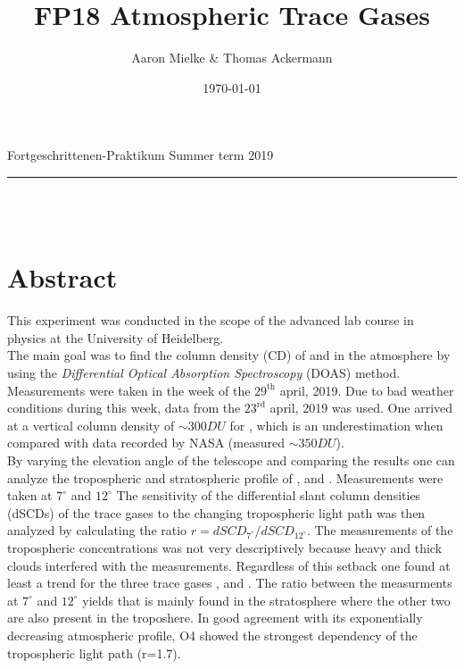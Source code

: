\documentclass[12pt, a4paper, bibliography=totoc]{scrartcl}
\title{FP18 Atmospheric Trace Gases}
\author{Aaron Mielke \& Thomas Ackermann}
\date{\today}
\begin{document}
\begin{center}
	\makeatletter
	\thispagestyle{empty}
	\large{Fortgeschrittenen-Praktikum}	
	\hfill
    \large{Summer term 2019}
    \vspace{5mm}
	\rule{\textwidth}{0.2pt}
    \vfill
	\Huge\textbf{\@title} \\
	\vspace{10mm}
	\large{\@author} \\
	\normalfont
	\vfill	
	\makeatother
\end{center}

\normalsize

\section*{Abstract}

This experiment was conducted in the scope of the advanced lab course in physics at the University of Heidelberg. \\
The main goal was to find the column density (CD) of  and  in the atmosphere by using the \textit{Differential Optical Absorption Spectroscopy} (DOAS) method. \\
Measurements were taken in the week of the $29^\text{th}$ april, 2019.
Due to bad weather conditions during this week, data from the $23^\text{rd}$ april, 2019 was used. 
One arrived at a vertical column density of $\sim 300 \si{DU}$ for , which is an underestimation when compared with data recorded by NASA (measured $\sim 350 \si{DU}$).\\ 
By varying the elevation angle of the telescope and comparing the results 
one can analyze the tropospheric and stratospheric profile of ,  and .
Measurements were taken at $7^\circ$ and $12^\circ$
The sensitivity of the differential slant column densities (dSCDs) of the trace gases to the changing tropospheric light path was then analyzed by calculating the ratio $r = dSCD_{7^\circ}/dSCD_{12^\circ}$. 
The measurements of the tropospheric concentrations was not very descriptively because heavy and thick clouds interfered with the measurements. 
Regardless of this setback one found at least a trend for the three trace gases ,  and . 
The ratio between the measurments at $7^{\circ}$ and $12^{\circ}$ yields that  is mainly found in the stratosphere where the other two are also present in the troposhere.
In good agreement with its exponentially decreasing atmospheric profile, O4 showed the strongest dependency of the tropospheric light path (r=1.7).
\end{document}
